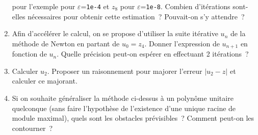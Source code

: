\documentclass[10pt,a4paper]{article}
\begin{document}
\begin{enumerate}
pour l'exemple pour $\varepsilon$=\verb|1e-4| et $z_8$ pour
$\varepsilon$=\verb|1e-8|. Combien d'it\'erations sont-elles
n\'ecessaires pour obtenir cette estimation~?
Pouvait-on s'y attendre~?
\item Afin d'acc\'el\'erer le calcul, on se propose d'utiliser la suite
it\'erative $u_n$ de la  m\'ethode de Newton en partant de $u_0=z_4$.
Donner l'expression de $u_{n+1}$ en fonction de $u_n$.
Quelle pr\'ecision peut-on esp\'erer 
en effectuant 2 it\'erations~?
\item Calculer $u_2$. Proposer un raisonnement pour
majorer l'erreur $|u_2-z|$ et calculer ce majorant.
\item Si on souhaite g\'en\'eraliser la m\'ethode ci-dessus \`a un
polyn\^ome unitaire quelconque (sans faire l'hypoth\`ese de
l'existence d'une unique racine de module maximal), quels
sont les obstacles pr\'evisibles~? Comment peut-on les contourner~?
\end{enumerate}

\eexer 
\end{document}
